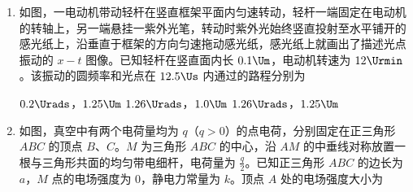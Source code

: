 \documentclass[\gkver]{gaokaozhenti}
\begin{document}
\begin{enumerate}

\item
如图，一电动机带动轻杆在竖直框架平面内匀速转动，轻杆一端固定在电动机的转轴上，另一端悬挂一紫外光笔，转动时紫外光始终竖直投射至水平铺开的感光纸上，沿垂直于框架的方向匀速拖动感光纸，感光纸上就画出了描述光点振动的 $x - t$ 图像。已知轻杆在竖直面内长 $0.1 \Um$，电动机转速为 $12 \Urmin$。该振动的圆频率和光点在 $12.5 \Us$ 内通过的路程分别为


{$0.2 \Urads$，$1.25 \Um$}
{$1.26 \Urads$，$1.0 \Um$}
{$1.26 \Urads$，$1.25 \Um$}


\item
如图，真空中有两个电荷量均为 $q$（$q > 0$）的点电荷，分别固定在正三角形 $ABC$ 的顶点 $B$、$C$。$M$ 为三角形 $ABC$ 的中心，沿 $AM$ 的中垂线对称放置一根与三角形共面的均匀带电细杆，电荷量为 $\frac{q}{2}$。已知正三角形 $ABC$ 的边长为 $a$，$M$ 点的电场强度为 0，静电力常量为 $k$。顶点 $A$ 处的电场强度大小为



\end{enumerate}
\end{document}
